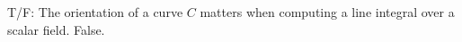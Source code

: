 {T/F: The orientation of a curve $C$ matters when computing a line integral over a scalar field.
}
{False.
}
